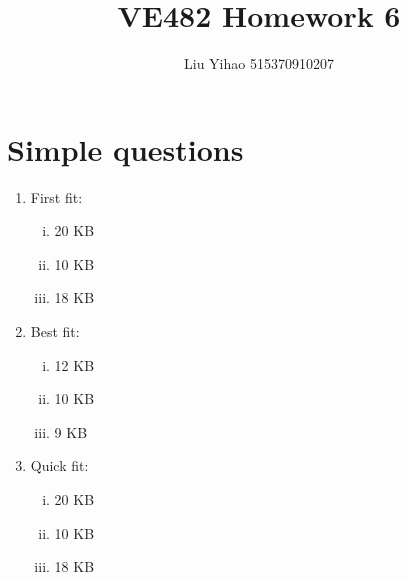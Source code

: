 \documentclass{article}
\title{VE482 Homework 6}
\author{Liu Yihao 515370910207}
\date{}
\begin{document}
\maketitle

\section{Simple questions}
\begin{enumerate}
\item First fit:
\begin{enumerate}[(i)]
\item 20 KB
\item 10 KB
\item 18 KB
\end{enumerate}
\item Best fit:
\begin{enumerate}[(i)]
\item 12 KB
\item 10 KB
\item 9 KB
\end{enumerate}
\item Quick fit:
\begin{enumerate}[(i)]
\item 20 KB
\item 10 KB
\item 18 KB
\end{enumerate}
\end{enumerate}
\end{document}
